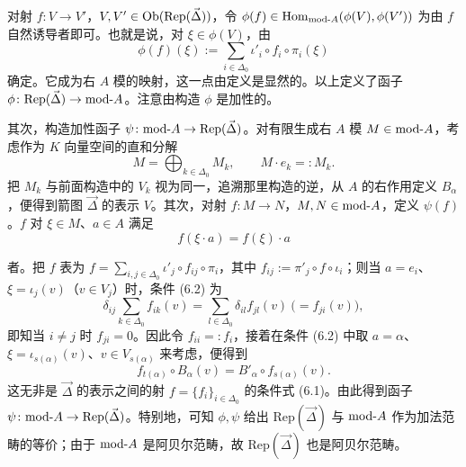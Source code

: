
对射 $f\colon V\to V'$，$V,V'\in\operatorname{Ob}(\mathrm{Rep}(\vec{\Delta}))$，令 $\phi(f)\in\operatorname{Hom}_{\mathrm{mod}\text{-}A}(\phi(V),\phi(V'))$ 为由 $f$ 自然诱导者即可。也就是说，对 $\xi\in\phi(V)$，由
\[
\phi(f)(\xi):=\sum_{i\in\Delta_0}\iota'_i\circ f_i\circ\pi_i(\xi)
\]
确定。它成为右 $A$ 模的映射，这一点由定义是显然的。以上定义了函子 $\phi\colon\mathrm{Rep}(\vec{\Delta})\to\mathrm{mod}\text{-}A$。注意由构造 $\phi$ 是加性的。

其次，构造加性函子 $\psi\colon\mathrm{mod}\text{-}A\to\mathrm{Rep}(\vec{\Delta})$。对有限生成右 $A$ 模 $M\in\mathrm{mod}\text{-}A$，考虑作为 $K$ 向量空间的直和分解
\[
M=\bigoplus_{k\in\Delta_0}M_k,\qquad M\cdot e_k=:M_k.
\]
把 $M_k$ 与前面构造中的 $V_k$ 视为同一，追溯那里构造的逆，从 $A$ 的右作用定义 $B_\alpha$，便得到箭图 $\vec{\Delta}$ 的表示 $V$。其次，对射 $f\colon M\to N$，$M,N\in\mathrm{mod}\text{-}A$，定义 $\psi(f)$。$f$ 对 $\xi\in M$、$a\in A$ 满足
\begin{equation}
f(\xi\cdot a)=f(\xi)\cdot a \tag{6.2}
\end{equation}

者。把 $f$ 表为 $f=\sum_{i,j\in\Delta_0}\iota'_j\circ f_{ij}\circ\pi_i$，其中 $f_{ij}:=\pi'_j\circ f\circ\iota_i$；则当 $a=e_i$、$\xi=\iota_j(v)$（$v\in V_j$）时，条件 (6.2) 为
\[
\delta_{ij}\sum_{k\in\Delta_0}f_{ik}(v)=\sum_{l\in\Delta_0}\delta_{il}f_{jl}(v)\ \bigl(=f_{ji}(v)\bigr),
\]
即知当 $i\neq j$ 时 $f_{ji}=0$。因此令 $f_{ii}=:f_i$，接着在条件 (6.2) 中取 $a=\alpha$、$\xi=\iota_{s(\alpha)}(v)$、$v\in V_{s(\alpha)}$ 来考虑，便得到
\[
f_{t(\alpha)}\circ B_\alpha(v)=B'_\alpha\circ f_{s(\alpha)}(v).
\]
这无非是 $\vec{\Delta}$ 的表示之间的射 $f=\{f_i\}_{i\in\Delta_0}$ 的条件式 (6.1)。由此得到函子 $\psi\colon\mathrm{mod}\text{-}A\to\mathrm{Rep}(\vec{\Delta})$。特别地，可知 $\phi,\psi$ 给出 $\mathrm{Rep}(\vec{\Delta})$ 与 $\mathrm{mod}\text{-}A$ 作为加法范畴的等价；由于 $\mathrm{mod}\text{-}A$ 是阿贝尔范畴，故 $\mathrm{Rep}(\vec{\Delta})$ 也是阿贝尔范畴。

